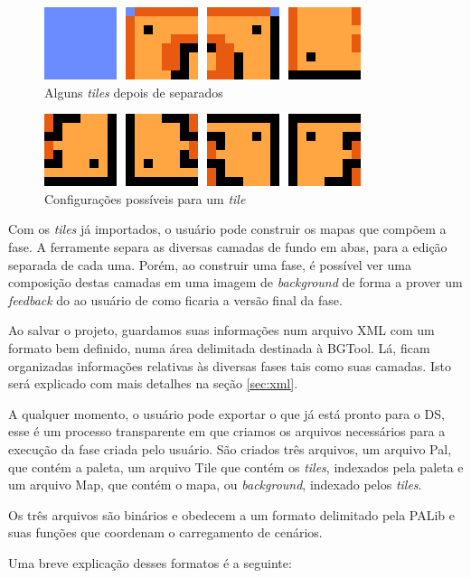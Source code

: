 \documentclass[brazil]{abnt}
\begin{document}
\begin{figure}[h!]
\centering
\includegraphics[scale=1]{imgs/tiles1.png}
\caption{Alguns \textit{tiles} depois de separados} 
\end{figure}

\begin{figure}[h!]
\centering
\includegraphics[scale=1]{imgs/tiles2.png}
\caption{Configurações possíveis para um \textit{tile}} 
\end{figure}

Com os \textit{tiles} já importados, o usuário pode construir os mapas que compõem a fase. A ferramente separa as diversas camadas de fundo em abas, para a edição separada de cada uma. Porém, ao construir uma fase, é possível ver uma composição destas camadas em uma imagem de \textit{background} de forma a prover um \textit{feedback} do ao usuário de como ficaria a versão final da fase.

Ao salvar o projeto, guardamos suas informações num arquivo XML com um formato bem definido, numa área delimitada destinada à BGTool. Lá, ficam organizadas informações relativas às diversas fases tais como suas camadas. Isto será explicado com mais detalhes na seção \ref{sec:xml}.

A qualquer momento, o usuário pode exportar o que já está pronto para o DS, esse é um processo transparente em que criamos os arquivos necessários para a execução da fase criada pelo usuário. São criados três arquivos, um arquivo Pal, que contém a paleta, um arquivo Tile que contém os \textit{tiles}, indexados pela paleta e um arquivo Map, que contém o mapa, ou \textit{background}, indexado pelos \textit{tiles}.
 
Os três arquivos são binários e obedecem a um formato delimitado pela PALib e suas funções que coordenam o carregamento de cenários.

Uma breve explicação desses formatos é a seguinte:
\end{document}
